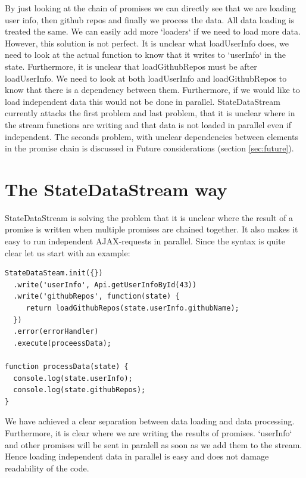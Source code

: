 \documentclass[a4paper,12pt]{article}
\begin{document}
By just looking at the chain of promises we can directly see that we are loading user info, then github repos and finally we process the data.
All data loading is treated the same. We can easily add more `loaders` if we need to load more data. However, this solution is not perfect.
It is unclear what loadUserInfo does, we need to look at the actual function to know that it writes to `userInfo` in the state. Furthermore,
it is unclear that loadGithubRepos must be after loadUserInfo. We need to look at both loadUserInfo and loadGithubRepos to know that there
is a dependency between them. Furthermore, if we would like to load independent data this would not be done in parallel. 
StateDataStream currently attacks the first problem and last problem, that it is unclear where in the stream functions are writing and that data is not loaded in parallel even if independent.
The seconds problem, with unclear dependencies between elements in the promise chain is discussed in Future considerations (section \ref{sec:future}).

\section{The StateDataStream way}
StateDataStream is solving the problem that it is unclear where the result of a promise is written when multiple promises are chained together. 
It also makes it easy to run independent AJAX-requests in parallel. Since the syntax is quite clear let us start with an example:

\begin{lstlisting}[caption=Pseudo code showing an approach using StateDataStream where we are loading two pieces of data\, where the second is dependent on the first., frame=single]
StateDataSteam.init({})
  .write('userInfo', Api.getUserInfoById(43))
  .write('githubRepos', function(state) {
     return loadGithubRepos(state.userInfo.githubName);
  })
  .error(errorHandler)
  .execute(proceessData);

function processData(state) {
  console.log(state.userInfo);
  console.log(state.githubRepos);
}
\end{lstlisting}

We have achieved a clear separation between data loading and data processing. Furthermore, it is clear where we are writing the results of promises. `userInfo` and other promises will be sent in paralell as
soon as we add them to the stream. Hence loading independent data in parallel is easy and does not damage readability of the code.
\end{document}
